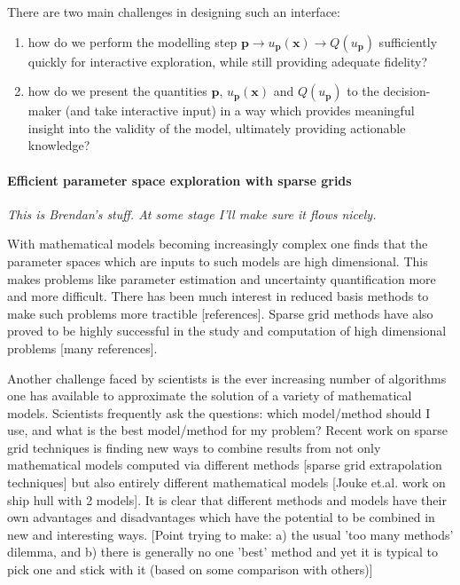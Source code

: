 \documentclass[a4paper,fontsize=12pt]{scrartcl}
\begin{document}
There are two main challenges in designing such an interface:
\begin{enumerate}
\item how do we perform the modelling step $\mathbf{p} \rightarrow
  u_{\mathbf{p}}(\mathbf{x}) \rightarrow Q(u_{\mathbf{p}})$ sufficiently quickly
  for interactive exploration, while still providing adequate
  fidelity?
\item how do we present the quantities $\mathbf{p}$, $u_{\mathbf{p}}(\mathbf{x})$
  and $Q(u_{\mathbf{p}})$ to the decision-maker (and take interactive input) in a
  way which provides meaningful insight into the validity of the
  model, ultimately providing actionable knowledge?
\end{enumerate}

\paragraph{Efficient parameter space exploration with sparse grids}

\emph{This is Brendan's stuff. At some stage I'll make sure it flows
  nicely.}

With mathematical models becoming increasingly complex one finds that
the parameter spaces which are inputs to such models are high
dimensional. This makes problems like parameter estimation and
uncertainty quantification more and more difficult. There has been
much interest in reduced basis methods to make such problems more
tractible [references]. Sparse grid methods have also proved to be
highly successful in the study and computation of high dimensional
problems [many references].

Another challenge faced by scientists is the ever increasing number of
algorithms one has available to approximate the solution of a variety
of mathematical models. Scientists frequently ask the questions: which
model/method should I use, and what is the best model/method for my
problem? Recent work on sparse grid techniques is finding new ways to
combine results from not only mathematical models computed via
different methods [sparse grid extrapolation techniques] but also
entirely different mathematical models [Jouke et.al. work on ship hull
with 2 models]. It is clear that different methods and models have
their own advantages and disadvantages which have the potential to be
combined in new and interesting ways. [Point trying to make: a) the
usual 'too many methods' dilemma, and b) there is generally no one
'best' method and yet it is typical to pick one and stick with it
(based on some comparison with others)]
\end{document}
